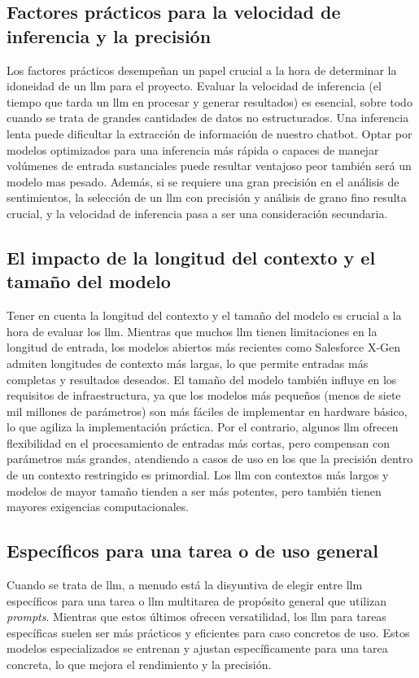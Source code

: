 \subsection{Factores prácticos para la velocidad de inferencia y la precisión}
Los factores prácticos desempeñan un papel crucial a la hora de determinar la idoneidad de un \acrshort{llm} para el proyecto. Evaluar la velocidad de inferencia (el tiempo que tarda un \acrshort{llm} en procesar y generar resultados) es esencial, sobre todo cuando se trata de grandes cantidades de datos no estructurados. Una inferencia lenta puede dificultar la extracción de información de nuestro chatbot. Optar por modelos optimizados para una inferencia más rápida o capaces de manejar volúmenes de entrada sustanciales puede resultar ventajoso peor también será un modelo mas pesado. Además, si se requiere una gran precisión en el análisis de sentimientos, la selección de un \acrshort{llm} con precisión y análisis de grano fino resulta crucial, y la velocidad de inferencia pasa a ser una consideración secundaria.


\subsection{El impacto de la longitud del contexto y el tamaño del modelo}
Tener en cuenta la longitud del contexto y el tamaño del modelo es crucial a la hora de evaluar los \acrshort{llm}. Mientras que muchos \acrshort{llm} tienen limitaciones en la longitud de entrada, los modelos abiertos más recientes como Salesforce X-Gen admiten longitudes de contexto más largas, lo que permite entradas más completas y resultados deseados. El tamaño del modelo también influye en los requisitos de infraestructura, ya que los modelos más pequeños (menos de siete mil millones de parámetros) son más fáciles de implementar en hardware básico, lo que agiliza la implementación práctica. Por el contrario, algunos \acrshort{llm} ofrecen flexibilidad en el procesamiento de entradas más cortas, pero compensan con parámetros más grandes, atendiendo a casos de uso en los que la precisión dentro de un contexto restringido es primordial. Los \acrshort{llm} con contextos más largos y modelos de mayor tamaño tienden a ser más potentes, pero también tienen mayores exigencias computacionales.

\subsection{Específicos para una tarea o de uso general}
Cuando se trata de \acrfull{llm}, a menudo está la disyuntiva de elegir entre \acrshort{llm} específicos para una tarea o \acrshort{llm} multitarea de propósito general que utilizan \textit{prompts}. Mientras que estos últimos ofrecen versatilidad, los \acrshort{llm} para tareas específicas suelen ser más prácticos y eficientes para caso concretos de uso. Estos modelos especializados se entrenan y ajustan específicamente para una tarea concreta, lo que mejora el rendimiento y la precisión. 

